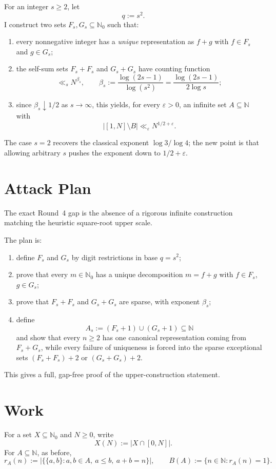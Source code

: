 For an integer $s\ge 2$, let
\[
q:=s^2.
\]
I construct two sets $F_s,G_s\subseteq \mathbb N_0$ such that:
\begin{enumerate}
\item every nonnegative integer has a \emph{unique} representation as $f+g$ with $f\in F_s$ and $g\in G_s$;
\item the self-sum sets $F_s+F_s$ and $G_s+G_s$ have counting function
\[
\ll_s N^{\beta_s},\qquad \beta_s:=\frac{\log(2s-1)}{\log(s^2)}=\frac{\log(2s-1)}{2\log s};
\]
\item since $\beta_s\downarrow 1/2$ as $s\to\infty$, this yields, for every $\varepsilon>0$, an infinite set $A\subseteq\mathbb N$ with
\[
|[1,N]\setminus B|\ll_\varepsilon N^{1/2+\varepsilon}.
\]
\end{enumerate}
The case $s=2$ recovers the classical exponent $\log 3/\log 4$; the new point is that allowing arbitrary $s$ pushes the exponent down to $1/2+\varepsilon$.

\section{Attack Plan}
\label{sec:round5-attack-plan}
The exact Round~4 gap is the absence of a rigorous infinite construction matching the heuristic square-root upper scale.

The plan is:
\begin{enumerate}
\item define $F_s$ and $G_s$ by digit restrictions in base $q=s^2$;
\item prove that every $m\in\mathbb N_0$ has a unique decomposition $m=f+g$ with $f\in F_s$, $g\in G_s$;
\item prove that $F_s+F_s$ and $G_s+G_s$ are sparse, with exponent $\beta_s$;
\item define
\[
A_s:=(F_s+1)\cup(G_s+1)\subseteq\mathbb N
\]
and show that every $n\ge 2$ has one canonical representation coming from $F_s+G_s$, while every failure of uniqueness is forced into the sparse exceptional sets $(F_s+F_s)+2$ or $(G_s+G_s)+2$.
\end{enumerate}
This gives a full, gap-free proof of the upper-construction statement.

\section{Work}
\label{sec:round5-work}
For a set $X\subseteq\mathbb N_0$ and $N\ge 0$, write
\[
X(N):=|X\cap [0,N]|.
\]
For $A\subseteq\mathbb N$, as before,
\[
r_A(n):=|\{\{a,b\}:a,b\in A,\ a\le b,\ a+b=n\}|,
\qquad
B(A):=\{n\in\mathbb N:r_A(n)=1\}.
\]

